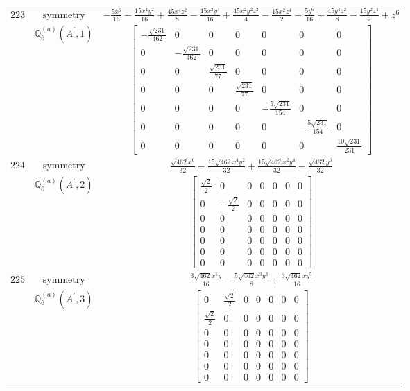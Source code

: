 \documentclass[fleqn,8pt,landscape]{jsarticle}
\begin{document}
\begin{longtable}{ccc}
$ 223 $ & $ \text{symmetry} $ & $ - \frac{5 x^{6}}{16} - \frac{15 x^{4} y^{2}}{16} + \frac{45 x^{4} z^{2}}{8} - \frac{15 x^{2} y^{4}}{16} + \frac{45 x^{2} y^{2} z^{2}}{4} - \frac{15 x^{2} z^{4}}{2} - \frac{5 y^{6}}{16} + \frac{45 y^{4} z^{2}}{8} - \frac{15 y^{2} z^{4}}{2} + z^{6} $ \\
$  $ & $ \mathbb{Q}_{6}^{(a)}(A^{\prime},1) $ & $ \begin{bmatrix} - \frac{\sqrt{231}}{462} & 0 & 0 & 0 & 0 & 0 & 0 \\ 0 & - \frac{\sqrt{231}}{462} & 0 & 0 & 0 & 0 & 0 \\ 0 & 0 & \frac{\sqrt{231}}{77} & 0 & 0 & 0 & 0 \\ 0 & 0 & 0 & \frac{\sqrt{231}}{77} & 0 & 0 & 0 \\ 0 & 0 & 0 & 0 & - \frac{5 \sqrt{231}}{154} & 0 & 0 \\ 0 & 0 & 0 & 0 & 0 & - \frac{5 \sqrt{231}}{154} & 0 \\ 0 & 0 & 0 & 0 & 0 & 0 & \frac{10 \sqrt{231}}{231} \end{bmatrix} $ \\ \hline
$ 224 $ & $ \text{symmetry} $ & $ \frac{\sqrt{462} x^{6}}{32} - \frac{15 \sqrt{462} x^{4} y^{2}}{32} + \frac{15 \sqrt{462} x^{2} y^{4}}{32} - \frac{\sqrt{462} y^{6}}{32} $ \\
$  $ & $ \mathbb{Q}_{6}^{(a)}(A^{\prime},2) $ & $ \begin{bmatrix} \frac{\sqrt{2}}{2} & 0 & 0 & 0 & 0 & 0 & 0 \\ 0 & - \frac{\sqrt{2}}{2} & 0 & 0 & 0 & 0 & 0 \\ 0 & 0 & 0 & 0 & 0 & 0 & 0 \\ 0 & 0 & 0 & 0 & 0 & 0 & 0 \\ 0 & 0 & 0 & 0 & 0 & 0 & 0 \\ 0 & 0 & 0 & 0 & 0 & 0 & 0 \\ 0 & 0 & 0 & 0 & 0 & 0 & 0 \end{bmatrix} $ \\ \hline
$ 225 $ & $ \text{symmetry} $ & $ \frac{3 \sqrt{462} x^{5} y}{16} - \frac{5 \sqrt{462} x^{3} y^{3}}{8} + \frac{3 \sqrt{462} x y^{5}}{16} $ \\
$  $ & $ \mathbb{Q}_{6}^{(a)}(A^{\prime},3) $ & $ \begin{bmatrix} 0 & \frac{\sqrt{2}}{2} & 0 & 0 & 0 & 0 & 0 \\ \frac{\sqrt{2}}{2} & 0 & 0 & 0 & 0 & 0 & 0 \\ 0 & 0 & 0 & 0 & 0 & 0 & 0 \\ 0 & 0 & 0 & 0 & 0 & 0 & 0 \\ 0 & 0 & 0 & 0 & 0 & 0 & 0 \\ 0 & 0 & 0 & 0 & 0 & 0 & 0 \\ 0 & 0 & 0 & 0 & 0 & 0 & 0 \end{bmatrix} $ \\ \hline

\end{longtable}
\end{document}
